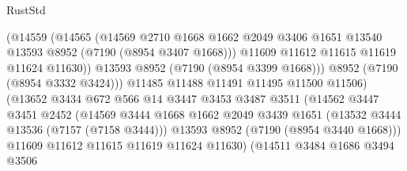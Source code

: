 \begin{lexlean}{RustStd}
\begin{coremodule}
                                (@14559
                                  (@14565
                                    (@14569
                                      @2710
                                      @1668
                                      @1662
                                      @2049
                                      @3406
                                      @1651
                                      @13540
                                      @13593
                                      @8952
                                      (@7190 (@8954 @3407 @1668)))
                                    @11609
                                    @11612
                                    @11615
                                    @11619
                                    @11624
                                    @11630))
                                @13593
                                @8952
                                (@7190 (@8954 @3399 @1668)))
                              @8952
                              (@7190 (@8954 @3332 @3424)))
                            @11485
                            @11488
                            @11491
                            @11495
                            @11500
                            @11506)
                          (@13652
                            @3434
                            @672
                            @566
                            @14
                            @3447
                            @3453
                            @3487
                            @3511
                            (@14562
                              @3447
                              @3451
                              @2452
                              (@14569
                                @3444
                                @1668
                                @1662
                                @2049
                                @3439
                                @1651
                                (@13532 @3444 @13536 (@7157 (@7158 @3444)))
                                @13593
                                @8952
                                (@7190 (@8954 @3440 @1668)))
                              @11609
                              @11612
                              @11615
                              @11619
                              @11624
                              @11630)
                            (@14511
                              @3484
                              @1686
                              @3494
                              @3506

\end{coremodule}
\end{lexlean}
